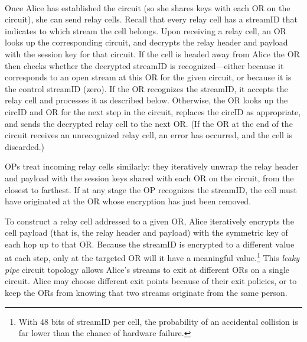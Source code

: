 \documentclass[twocolumn]{article}
\begin{document}
\\
%
Once Alice has established the circuit (so she shares keys with each
OR on the circuit), she can send relay cells.  Recall that every relay
cell has a streamID that indicates to which
stream the cell belongs.  %
Upon receiving a relay
cell, an OR looks up the corresponding circuit, and decrypts the relay
header and payload with the session key for that circuit.
If the cell is headed away from Alice the OR then checks
whether the decrypted streamID is recognized---either because it
corresponds to an open stream at this OR for the given circuit, or because
it is the control streamID (zero).  If the OR recognizes the
streamID, it accepts the relay cell and processes it as described
below.  Otherwise,
the OR looks up the circID and OR for the
next step in the circuit, replaces the circID as appropriate, and
sends the decrypted relay cell to the next OR.  (If the OR at the end
of the circuit receives an unrecognized relay cell, an error has
occurred, and the cell is discarded.)

OPs treat incoming relay cells similarly: they iteratively unwrap the
relay header and payload with the session keys shared with each
OR on the circuit, from the closest to farthest. %
If at any stage the OP recognizes the streamID, the cell must have
originated at the OR whose encryption has just been removed.

To construct a relay cell addressed to a given OR, Alice iteratively
encrypts the cell payload (that is, the relay header and payload) with
the symmetric key of each hop up to that OR.  Because the streamID is
encrypted to a different value at each step, only at the targeted OR
will it have a meaningful value.\footnote{
With 48 bits of streamID per cell, the probability of an accidental
collision is far lower than the chance of hardware failure.}
This \emph{leaky pipe} circuit topology
allows Alice's streams to exit at different ORs on a single circuit.
Alice may choose different exit points because of their exit policies,
or to keep the ORs from knowing that two streams
originate from the same person.
\end{document}
